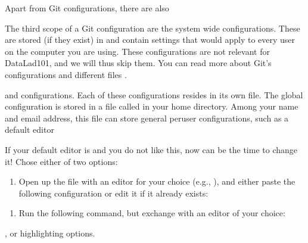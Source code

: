\sphinxAtStartPar
Apart from  Git configurations, there are also %
\begin{footnote}\sphinxAtStartFootnote
The third scope of a Git configuration are the system wide configurations.
These are stored (if they exist) in  and contain settings that would
apply to every user on the computer you are using. These configurations
are not relevant for DataLad\sphinxhyphen{}101, and we will thus skip them. You can
read more about Git’s configurations and different files
.
%
\end{footnote}
and  configurations. Each of these configurations
resides in its own file. The global configuration is stored in a file called
 in your home directory. Among
your name and email address, this file can store general
per\sphinxhyphen{}user configurations, such as a default editor%
\begin{footnote}\sphinxAtStartFootnote
If your default editor is {\hyperref[\detokenize{glossary:term-vim}]{}} and you do not like this, now can be the time
to change it! Chose either of two options:
\begin{enumerate}
%
\item {} 
\sphinxAtStartPar
Open up the file with an editor for your choice (e.g., ), and either paste the following configuration or edit it if it already exists:

\end{enumerate}

\sphinxSetupCodeBlockInFootnote
\begin{sphinxVerbatim}[commandchars=\\\{\}]
\end{sphinxVerbatim}
\begin{enumerate}
%
\setcounter{enumi}{1}
\item {} 
\sphinxAtStartPar
Run the following command, but exchange  with an editor of your choice:

\end{enumerate}

\sphinxSetupCodeBlockInFootnote
\begin{sphinxVerbatim}[commandchars=\\\{\}]
\end{sphinxVerbatim}
%
\end{footnote}, or highlighting
options.

